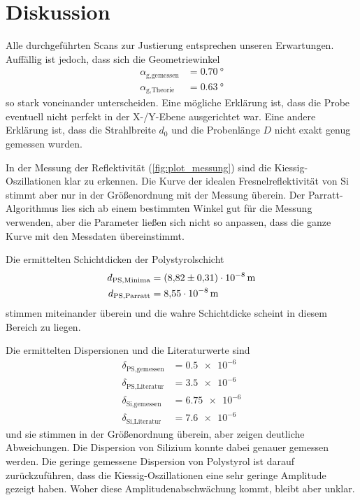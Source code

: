 \section{Diskussion}
\label{sec:Diskussion}

Alle durchgeführten Scans zur Justierung entsprechen unseren Erwartungen.
Auffällig ist jedoch, dass sich die Geometriewinkel
\begin{align*}
    \alpha_\text{g,gemessen} &= \SI{0.70}{\degree} \\
    \alpha_\text{g,Theorie} &= \SI{0.63}{\degree}
\end{align*}
so stark voneinander unterscheiden. 
Eine mögliche Erklärung ist, dass die Probe eventuell nicht perfekt in der X-/Y-Ebene ausgerichtet war.
Eine andere Erklärung ist, dass die Strahlbreite $d_0$ und die Probenlänge $D$ nicht exakt genug gemessen wurden.

In der Messung der Reflektivität (\autoref{fig:plot_messung}) sind die Kiessig-Oszillationen klar zu erkennen.
Die Kurve der idealen Fresnelreflektivität von Si stimmt aber nur in der Größenordnung mit der Messung überein.
Der Parratt-Algorithmus lies sich ab einem bestimmten Winkel gut für die Messung verwenden, 
aber die Parameter ließen sich nicht so anpassen, dass die ganze Kurve mit den Messdaten übereinstimmt.

Die ermittelten Schichtdicken der Polystyrolschicht
\begin{align*}
    d_\text{PS,Minima} &= \SI{8.82+-0.31e-8}{\meter} \\
    d_\text{PS,Parratt} &= \SI{8.55e-8}{\meter}
\end{align*}
stimmen miteinander überein und die wahre Schichtdicke scheint in diesem Bereich zu liegen.

Die ermittelten Dispersionen und die Literaturwerte sind
\begin{align*}
    \delta_\text{PS,gemessen} &= \num{0.5e-6} \\
    \delta_\text{PS,Literatur} &= \num{3.5e-6} \\
    \delta_\text{Si,gemessen} &= \num{6.75e-6} \\
    \delta_\text{Si,Literatur} &= \num{7.6e-6}
\end{align*}
und sie stimmen in der Größenordnung überein, aber zeigen deutliche Abweichungen.\cite{V44old}
Die Dispersion von Silizium konnte dabei genauer gemessen werden.
Die geringe gemessene Dispersion von Polystyrol ist darauf zurückzuführen, 
dass die Kiessig-Oszillationen eine sehr geringe Amplitude gezeigt haben.
Woher diese Amplitudenabschwächung kommt, bleibt aber unklar.

